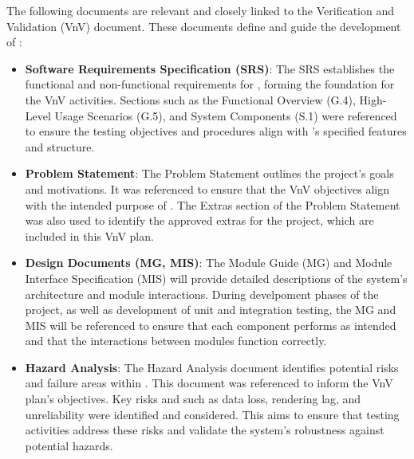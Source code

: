 \documentclass[12pt, titlepage]{article}
\begin{document}



\noindent The following documents are relevant and closely linked to the Verification
and Validation (VnV) document. These documents define and guide the development of
\progname{}:

\begin{itemize}
  \item \textbf{Software Requirements Specification (SRS)}:
  The SRS establishes the functional and non-functional requirements for \progname{},
  forming the foundation for the VnV activities. Sections such as the Functional
  Overview (G.4), High-Level Usage Scenarios (G.5), and System Components (S.1) were
  referenced to ensure the testing objectives and procedures align with \progname{}'s
  specified features and structure.
  \item \textbf{Problem Statement}:
  The Problem Statement outlines the project's goals and motivations. It was referenced
  to ensure that the VnV objectives align with the intended purpose of \progname{}. The
  Extras section of the Problem Statement was also used to identify the approved extras
  for the project, which are included in this VnV plan.
  \item \textbf{Design Documents (MG, MIS)}:
  The Module Guide (MG) and Module Interface Specification (MIS) will provide detailed
  descriptions of the system's architecture and module interactions. During develpoment
  phases of the project, as well as development of unit and integration testing, the
  MG and MIS will be referenced to ensure that each component performs as intended and
  that the interactions between modules function correctly.
  \item \textbf{Hazard Analysis}:
  The Hazard Analysis document identifies potential risks and failure areas within
  \progname{}. This document was referenced to inform the VnV plan's objectives. Key
  risks and such as data loss, rendering lag, and unreliability were identified and
  considered. This aims to ensure that testing activities address these risks and
  validate the system's robustness against potential hazards.
\end{itemize}
\end{document}
